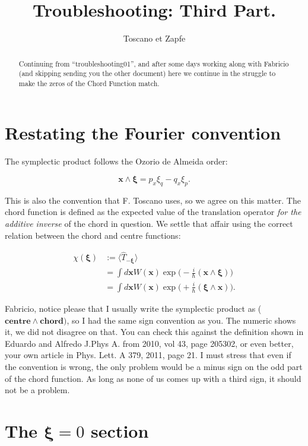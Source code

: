 \documentclass[a4paper,12pt]{article}
\title{ Troubleshooting: Third Part.}
\author{Toscano et Zapfe}
\newcommand{\ihb}{\frac{i}{\hbar}}
\newcommand{\xfase}{\mathbf{x}}
\newcommand{\xifase}{ {\boldsymbol{\xi}} }
\begin{document}
\maketitle

\begin{abstract}
Continuing from ``troubleshooting01'', and after some days working along
with Fabricio (and skipping sending you the other document) here we continue
in the struggle to make the zeros of the Chord Function match.
\end{abstract}


\section{Restating the Fourier convention}


The symplectic product follows the Ozorio de Almeida order:

\begin{equation}
\xfase\wedge\xifase=p_x\xi_q - q_x \xi_p.
\end{equation}

This is also the convention that F. Toscano uses, so we agree on this
matter. 
The chord function is defined as the expected value of the
translation operator \emph{for the additive inverse} of
the chord in question. We settle that affair using the correct relation
between the chord and centre functions:

\begin{align}\label{conventionsign}
\chi(\xifase) &:=\langle \hat{T}_{-\xifase} \rangle \\
&=\int d\xfase
W(\xfase)\exp \big(-\ihb (\xfase\wedge \xifase) \big) \\
&=\int d\xfase
W(\xfase)\exp \big(+\ihb (\xifase\wedge \xfase) \big).
\end{align}

Fabricio, notice please that I usually  write the symplectic product as
($\textbf{centre}\wedge\textbf{chord}) $, so I had the same sign convention
as you. The numeric shows it,  we did not disagree on that.   
You can check this against the definition shown in
Eduardo and Alfredo J.Phys A. from 2010, vol 43, page 205302,
or even better, your own article in Phys. Lett. A 379, 2011, page 21.
I must stress that even if the convention is wrong, the only problem
would be a minus sign on the odd part of the chord
function. As long as none of us comes up with a third sign, it should not
be a problem.

\section{The $\xifase=0$ section}
\end{document}
